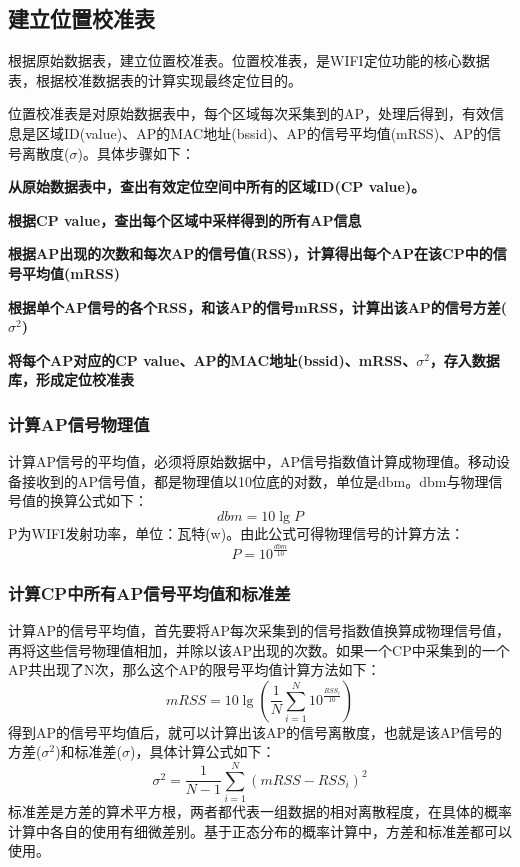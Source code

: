 \documentclass[UTF8, twocolumn ]{ctexart}
\begin{document}
\subsection{建立位置校准表}
根据原始数据表，建立位置校准表。位置校准表，是WIFI定位功能的核心数据表，根据校准数据表的计算实现最终定位目的。
\par
位置校准表是对原始数据表中，每个区域每次采集到的AP，处理后得到，有效信息是区域ID(value)、AP的MAC地址(bssid)、AP的信号平均值(mRSS)、AP的信号离散度($\sigma$)。具体步骤如下：
\begin{compactitem}
\item\textbf{从原始数据表中，查出有效定位空间中所有的区域ID(CP value)。}
\item\textbf{根据CP value，查出每个区域中采样得到的所有AP信息}
\item\textbf{根据AP出现的次数和每次AP的信号值(RSS)，计算得出每个AP在该CP中的信号平均值(mRSS)}
\item\textbf{根据单个AP信号的各个RSS，和该AP的信号mRSS，计算出该AP的信号方差($\sigma^{2}$)}
\item\textbf{将每个AP对应的CP value、AP的MAC地址(bssid)、mRSS、$\sigma^{2}$，存入数据库，形成定位校准表}
\end{compactitem}

\subsubsection{计算AP信号物理值}
计算AP信号的平均值，必须将原始数据中，AP信号指数值计算成物理值。移动设备接收到的AP信号值，都是物理值以10位底的对数，单位是dbm。dbm与物理信号值的换算公式如下：
\begin{displaymath}
  dbm=10\lg{P}
\end{displaymath}
P为WIFI发射功率，单位：瓦特(w)。由此公式可得物理信号的计算方法：
\begin{displaymath}
  P=10^{\frac{dbm}{10}}
\end{displaymath}

\subsubsection{计算CP中所有AP信号平均值和标准差}
计算AP的信号平均值，首先要将AP每次采集到的信号指数值换算成物理信号值，再将这些信号物理值相加，并除以该AP出现的次数。如果一个CP中采集到的一个AP共出现了N次，那么这个AP的限号平均值计算方法如下：
\begin{displaymath}
  mRSS=10\lg\left(\frac{1}{N}\sum^{N}_{i=1}10^{\frac{RSS_{i}}{10}}\right)
\end{displaymath}
得到AP的信号平均值后，就可以计算出该AP的信号离散度，也就是该AP信号的方差($\sigma^{2}$)和标准差($\sigma$)，具体计算公式如下：
\begin{displaymath}
  \sigma^{2}=\frac{1}{N-1}\sum^{N}_{i=1}\left(mRSS-RSS_{i}\right)^{2}
\end{displaymath}
标准差是方差的算术平方根，两者都代表一组数据的相对离散程度，在具体的概率计算中各自的使用有细微差别。基于正态分布的概率计算中，方差和标准差都可以使用。
\end{document}

